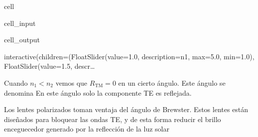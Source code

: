 \documentclass[letterpaper,10pt,english]{jupyterBook}
\let\sphinxpxdimen\pdfpxdimen\else\newdimen\sphinxpxdimen
\begin{document}
\begin{sphinxuseclass}{cell}\begin{sphinxVerbatimInput}

\begin{sphinxuseclass}{cell_input}
\begin{sphinxVerbatim}[commandchars=\\\{\}]
   

    
  
     
\end{sphinxVerbatim}

\end{sphinxuseclass}\end{sphinxVerbatimInput}
\begin{sphinxVerbatimOutput}

\begin{sphinxuseclass}{cell_output}
\begin{sphinxVerbatim}[commandchars=\\\{\}]
interactive(children=(FloatSlider(value=1.0, description=\PYGZsq{}n1\PYGZsq{}, max=5.0, min=1.0), FloatSlider(value=1.5, descr…
\end{sphinxVerbatim}

\end{sphinxuseclass}\end{sphinxVerbatimOutput}

\end{sphinxuseclass}
\sphinxAtStartPar
Cuando \(n_1 < n_2\) vemos que \(R_\mathrm{TM} = 0\) en un cierto ángulo. Este ángulo se denomina  En este ángulo solo la componente TE es reflejada.

\sphinxAtStartPar
Los lentes polarizados toman ventaja del ángulo de Brewster. Estos lentes están diseñados para bloquear las ondas TE, y de esta forma reducir el brillo enceguecedor generado por la reflección de la luz solar

\noindent{\hspace*{\fill}\sphinxincludegraphics[width=350\sphinxpxdimen]{{polarized_glasses}.jpg}\hspace*{\fill}}
\end{document}
